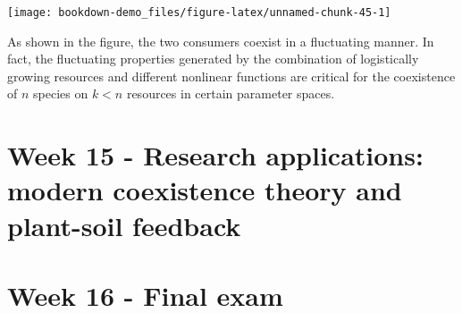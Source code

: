 \documentclass[
]{book}
\begin{document}
\begin{center}\texttt{[image: bookdown-demo\_files/figure-latex/unnamed-chunk-45-1]} \end{center}

As shown in the figure, the two consumers coexist in a fluctuating manner. In fact, the fluctuating properties generated by the combination of logistically growing resources and different nonlinear functions are critical for the coexistence of \(n\) species on \(k<n\) resources in certain parameter spaces.

\hypertarget{week-15---research-applications-modern-coexistence-theory-and-plant-soil-feedback}{%
\chapter*{Week 15 - Research applications: modern coexistence theory and plant-soil feedback}\label{week-15---research-applications-modern-coexistence-theory-and-plant-soil-feedback}}

\hypertarget{week-16---final-exam}{%
\chapter*{Week 16 - Final exam}\label{week-16---final-exam}}

  
\end{document}
